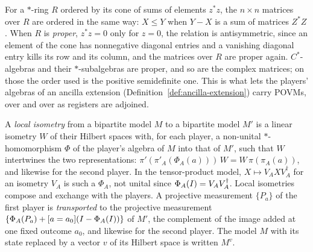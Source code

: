 \begin{definition}
\label{def:block-order}
\leanok
For a $*$-ring $R$ ordered by its cone of sums of elements $z^* z$, the $n \times n$ matrices over
$R$ are ordered in the same way: $X \leq Y$ when $Y - X$ is a sum of matrices $Z^* Z$. When $R$ is
\emph{proper}, $z^* z = 0$ only for $z = 0$, the relation is antisymmetric, since an element of the
cone has nonnegative diagonal entries and a vanishing diagonal entry kills its row and its column,
and the matrices over $R$ are proper again. $C^*$-algebras and their $*$-subalgebras are proper, and
so are the complex matrices; on those the order used is the positive semidefinite one. This is what
lets the players' algebras of an ancilla extension (Definition~\ref{def:ancilla-extension}) carry
POVMs, over and over as registers are adjoined.
\end{definition}

\begin{definition}
\label{def:local-isometry}
\leanok
A \emph{local isometry} from a bipartite model $M$ to a bipartite model $M'$ is a linear isometry
$W$ of their Hilbert spaces with, for each player, a non-unital $*$-homomorphism $\Phi$ of the
player's algebra of $M$ into that of $M'$, such that $W$ intertwines the two representations:
$\pi'(\pi'_A(\Phi_A(a)))\, W = W\, \pi(\pi_A(a))$, and likewise for the second player. In the
tensor-product model, $X \mapsto V_A X V_A^\dagger$ for an isometry $V_A$ is such a $\Phi_A$, not
unital since $\Phi_A(I) = V_A V_A^\dagger$. Local isometries compose and exchange with the
players. A projective measurement $\{P_a\}$ of the first player is \emph{transported} to the
projective measurement $\{\Phi_A(P_a) + [a = a_0](I - \Phi_A(I))\}$ of $M'$, the complement of
the image added at one fixed outcome $a_0$, and likewise for the second player. The model $M$ with
its state replaced by a vector $v$ of its Hilbert space is written $M^{v}$.
\end{definition}

